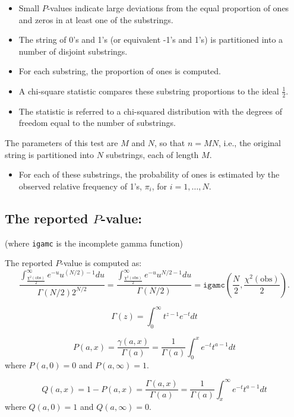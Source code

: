 \documentclass[12pt,openany]{book}
\theoremstyle{definition}
\begin{document}
	\begin{itemize}
		\item Small \( P \)-values indicate large deviations from the equal proportion of ones and zeros in at least one of the substrings.
		\item The string of 0's and 1's (or equivalent -1's and 1's) is partitioned into a number of disjoint substrings.
		\item For each substring, the proportion of ones is computed.
		\item A chi-square statistic compares these substring proportions to the ideal \( \frac{1}{2} \).
		\item The statistic is referred to a chi-squared distribution with the degrees of freedom equal to the number of substrings.
	\end{itemize}
	
	The parameters of this test are \( M \) and \( N \), so that \( n = MN \), i.e., the original string is partitioned into \( N \) substrings, each of length \( M \).
	
	\begin{itemize}
		\item For each of these substrings, the probability of ones is estimated by the observed relative frequency of 1's, \( \pi_i \), for \( i = 1, \ldots, N \).
	\end{itemize}
	
	\newpage
	\subsection{The reported \( P \)-value:}
	(where \texttt{igamc} is the incomplete gamma function)
	
	The reported \( P \)-value is computed as:
	\[
	\frac{\int_{\frac{\chi^2(\text{obs})}{2}}^{\infty} e^{-u} u^{(N/2)-1} du}{\Gamma(N/2)2^{N/2}} = \frac{\int_{\frac{\chi^2(\text{obs})}{2}}^{\infty} e^{-u} u^{N/2-1} du}{\Gamma(N/2)}
	= \texttt{igamc}\left( \frac{N}{2}, \frac{\chi^2(\text{obs})}{2} \right).
	\]
	
	\[
	\Gamma(z) = \int_{0}^{\infty} t^{z-1}e^{-t}dt
	\]
	
	\[
	P(a,x) = \frac{\gamma(a,x)}{\Gamma(a)} = \frac{1}{\Gamma(a)}\int_{0}^{x}e^{-t}t^{a-1}dt
	\]
	where \(P(a,0) = 0\) and \(P(a,\infty) = 1\).
	
	\[
	Q(a,x) = 1 - P(a,x) = \frac{\Gamma(a,x)}{\Gamma(a)} = \frac{1}{\Gamma(a)}\int_{x}^{\infty}e^{-t}t^{a-1}dt
	\]
	where \(Q(a,0) = 1\) and \(Q(a,\infty) = 0\).
\end{document}
